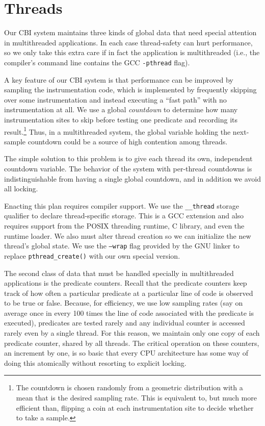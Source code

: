 \documentclass[10pt,twocolumn]{article}
\begin{document}
\section{Threads}

Our CBI system maintains three kinds of global data that 
need special attention in multithreaded
applications.  In each case thread-safety can hurt performance, 
so we only take this extra care if in fact the application is multithreaded
(i.e., the compiler's command line contains the GCC \texttt{-pthread} flag).

A key feature of our CBI system is that performance can be improved by
sampling the instrumentation code, which is implemented by frequently
skipping over some instrumentation and instead executing a ``fast
path'' with no instrumentation at all.  We use a global \emph{countdown}
to determine how many instrumentation sites to skip before
testing one predicate and recording its result.\footnote{The countdown
is chosen randomly from a geometric distribution with a mean that is
the desired sampling rate.  This is equivalent to, but much more
efficient than, flipping a coin at each instrumentation site to decide
whether to take a sample.}  Thus, in a multithreaded system, the
global variable holding the next-sample countdown could be a source of
high contention among threads.

The simple solution to this problem is to give each thread its own,
independent countdown variable.  The behavior of the system with per-thread
countdowns is indistinguishable from having a single global countdown,
and in addition we avoid all locking.

Enacting this plan requires compiler support.  We use the
\texttt{\_\_thread} storage qualifier to declare thread-specific
storage.  This is a GCC extension and also requires support from the
POSIX threading runtime, C library, and even the runtime loader.  
We also must alter thread creation so we can initialize the
new thread's global state.  We use the \texttt{--wrap} flag provided
by the GNU linker to replace \texttt{pthread\_create()} with our own
special version.  

The second class of data that must be handled specially in
multithreaded applications is the predicate counters.  Recall that
the predicate counters keep track of how often a particular predicate
at a particular line of code is observed to be true or false.
Because, for efficiency, we use low sampling rates (say on average
once in every 100 times the line of code associated with the predicate
is executed), predicates are tested rarely and any individual counter
is accessed rarely even by a single thread.  For this reason, we
maintain only one copy of each predicate counter, shared by all
threads.  The critical operation on these counters, an increment by
one, is so basic that every CPU architecture has some way of doing
this atomically without resorting to explicit locking.
\end{document}
